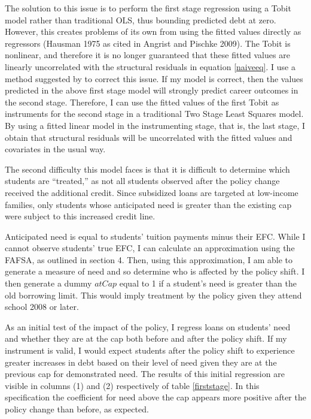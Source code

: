 \documentclass[12pt]{article}
\begin{document}
	The solution to this issue is to perform the first stage regression using a Tobit model rather than traditional OLS, thus bounding predicted debt at zero. However, this creates problems of its own from using the fitted values directly as regressors (Hausman 1975 as cited in Angrist and Pischke 2009).	 The Tobit is nonlinear, and therefore it is no longer guaranteed that these fitted values are linearly uncorrelated with the structural residuals in equation \ref{naiveeq}. I use a method suggested by \textcite{angrist2009} to correct this issue. If my model is correct, then the values predicted in the above first stage model will strongly predict career outcomes in the second stage. Therefore, I can use the fitted values of the first Tobit as instruments for the second stage in a traditional Two Stage Least Squares model. By using a fitted linear model in the instrumenting stage, that is, the last stage, I obtain that structural residuals will be uncorrelated with the fitted values and covariates in the usual way. 
	
	The second difficulty this model faces is that it is difficult to determine which students are ``treated,'' as not all students observed after the policy change received the additional credit. Since subsidized loans are targeted at low-income families, only students whose anticipated need is greater than the existing cap were subject to this increased credit line. 
	
	Anticipated need is equal to students' tuition payments minus their EFC. While I cannot observe students' true EFC, I can calculate an approximation using the FAFSA, as outlined in section 4. Then, using this approximation, I am able to generate a measure of need and so determine who is affected by the policy shift. I then generate a dummy $atCap$ equal to 1 if a student's need is greater than the old borrowing limit. This would imply treatment by the policy given they attend school 2008 or later.
	
	As an initial test of the impact of the policy, I regress loans on students' need and whether they are at the cap both before and after the policy shift. If my instrument is valid, I would expect students after the policy shift to experience greater increases in debt based on their level of need given they are at the previous cap for demonstrated need. The results of this initial regression are visible in columns (1) and (2) respectively of table \ref{firststage}. In this specification the coefficient for need above the cap appears more positive after the policy change than before, as expected. 
	
\end{document}
